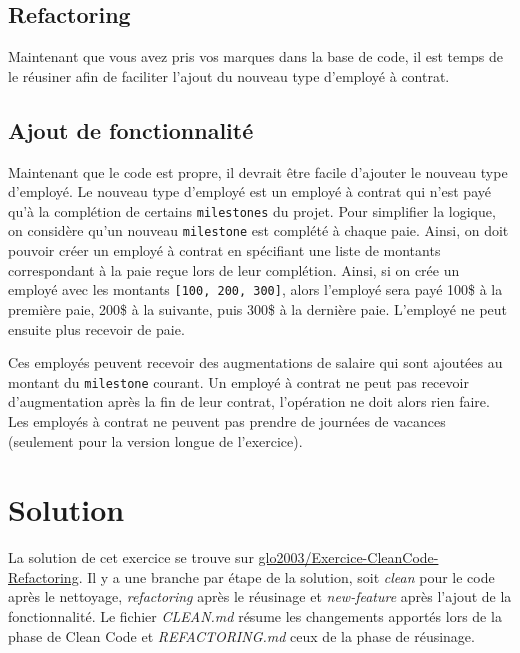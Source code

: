 \documentclass[french]{article}
\begin{document}
\subsection{Refactoring}

Maintenant que vous avez pris vos marques dans la base de code, il est temps de le réusiner afin de faciliter l'ajout du nouveau type d'employé à contrat.


\subsection{Ajout de fonctionnalité}

Maintenant que le code est propre, il devrait être facile d'ajouter le nouveau type d'employé. Le nouveau type d'employé est un employé à contrat qui n'est payé qu'à la complétion de certains \texttt{milestones} du projet. Pour simplifier la logique, on considère qu'un nouveau \texttt{milestone} est complété à chaque paie. Ainsi, on doit pouvoir créer un employé à contrat en spécifiant une liste de montants correspondant à la paie reçue lors de leur complétion. Ainsi, si on crée un employé avec les montants \texttt{[100, 200, 300]}, alors l'employé sera payé 100\$ à la première paie, 200\$ à la suivante, puis 300\$ à la dernière paie. L'employé ne peut ensuite plus recevoir de paie.

Ces employés peuvent recevoir des augmentations de salaire qui sont ajoutées au montant du \texttt{milestone} courant. Un employé à contrat ne peut pas recevoir d'augmentation après la fin de leur contrat, l'opération ne doit alors rien faire. Les employés à contrat ne peuvent pas prendre de journées de vacances (seulement pour la version longue de l'exercice).

\section{Solution}
La solution de cet exercice se trouve sur \href{https://github.com/glo2003/Exercice-CleanCode-Refactoring}{glo2003/Exercice-CleanCode-Refactoring}. Il y a une branche par étape de la solution, soit \textit{clean} pour le code après le nettoyage, \textit{refactoring} après le réusinage et \textit{new-feature} après l'ajout de la fonctionnalité. Le fichier \textit{CLEAN.md} résume les changements apportés lors de la phase de Clean Code et \textit{REFACTORING.md} ceux de la phase de réusinage.



\end{document}
